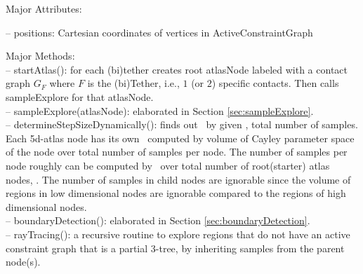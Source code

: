 \begin{enumerate}
\begin{comment}
AtlasBuilder currently follows predefined direction to walk through on sampling space.
It can be modified to have a recursive sampling so that wastefully sampling the body of the violated region will be  eliminated.
Since recursive sampling can identify the boundary of the violated region by sampling from all directions.
%
Also again recursive sampling can identify the boundary of feasible region hence would eliminate boundary computation in every step. :)
(Actually even in predefined direction sampling, you do not need to compute boundaries, just keep sampling, if you hit a neg volume then stop sampling in that direction.! )
(No, you may jump to an infeasible region and stuck there, it should always start sampling withing feasible region computed by chart.)
\end{comment}

\smallskip
Major Attributes:

\noindent --  \textsf{positions}: Cartesian coordinates of vertices in ActiveConstraintGraph

\smallskip
Major Methods:\\
\smallskip
\noindent --  \textsf{startAtlas()}: for each (bi)tether creates root atlasNode labeled with a contact graph $G_F$ where $F$ is the (bi)Tether, i.e., $1$ (or $2$) specific contacts. Then calls sampleExplore for that atlasNode.\\
\smallskip
\noindent --  \textsf{sampleExplore(atlasNode)}: elaborated in Section \ref{sec:sampleExplore}.\\
\smallskip
\noindent --  \textsf{determineStepSizeDynamically()}: finds out \stp\ by given \tns, total number of samples. Each 5d-atlas node has its own \stp\ computed by volume of Cayley parameter space of the node over total number of samples per node. The number of samples per node roughly can be computed by \tns\ over total number of root(starter) atlas nodes, \m. The number of samples in child nodes are ignorable since the volume of regions in low dimensional nodes are ignorable compared to the regions of high dimensional nodes. \\
\smallskip
\noindent --  \textsf{boundaryDetection()}: elaborated in Section \ref{sec:boundaryDetection}.\\
\smallskip
\noindent --  \textsf{rayTracing()}:
a recursive routine to explore regions that do not have an active constraint graph that is a partial 3-tree, by inheriting samples from
the parent node(s).\\


\end{enumerate}


